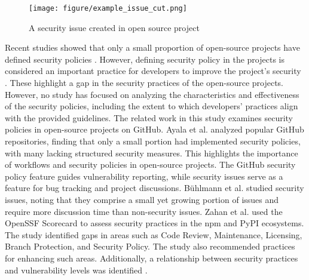 
\begin{figure}[!]
    \centering
    \texttt{[image: figure/example\_issue\_cut.png]}
    \caption{A security issue created in open source project}
    
    \label{fig:example_issue}
    \vspace*{-.75cm}
\end{figure}


Recent studies showed that only a small proportion of open-source projects have defined security policies \cite{Ayala:SVM2023}. However, defining security policy in the projects is considered an important practice for developers to improve the project's security \cite{Zahan:ICSE2023}. These highlight a gap in the security practices of the open-source projects. However, no study has focused on analyzing the characteristics and effectiveness of the security policies, including the extent to which developers' practices align with the provided guidelines.
The related work in this study examines security policies in open-source projects on GitHub. Ayala et al. \cite{Ayala:SVM2023} analyzed popular GitHub repositories, finding that only a small portion had implemented security policies, with many lacking structured security measures. This highlights the importance of workflows and security policies in open-source projects. The GitHub security policy feature guides vulnerability reporting, while security issues serve as a feature for bug tracking and project discussions. Bühlmann et al. \cite{Noah:SAC2022} studied security issues, noting that they comprise a small yet growing portion of issues and require more discussion time than non-security issues.
Zahan et al. \cite{Zahan:IEEE} used the OpenSSF Scorecard to assess security practices in the npm and PyPI ecosystems. The study identified gaps in areas such as Code Review, Maintenance, Licensing, Branch Protection, and Security Policy. The study also recommended practices for enhancing such areas. Additionally, a relationship between security practices and vulnerability levels was identified \cite{Zahan:ICSE2023}.

